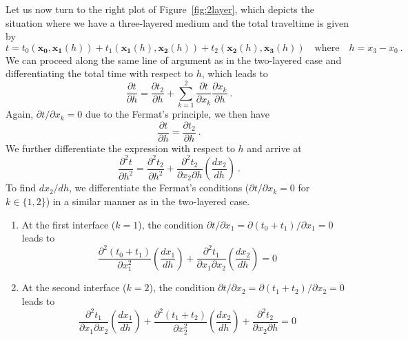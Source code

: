 Let us now turn to the right plot of Figure~\ref{fig:2layer}, which depicts the situation where we have a three-layered medium and the total traveltime is given by
\begin{equation}
\label{eq:time3l}
t = t_0(\mathbf{x_0},\mathbf{x_1}(h)) + t_1(\mathbf{x_1}(h),\mathbf{x_2}(h)) + t_2(\mathbf{x_2}(h),\mathbf{x_3}(h)) \quad\text{where}\quad h = x_3-x_0~.
\end{equation}
We can proceed along the same line of argument as in the two-layered case and differentiating the total time with respect to $h$, which leads to
\begin{equation}
\frac{\partial t}{\partial h} = \frac{\partial t_2}{\partial h} +  \sum^2_{k=1} \frac{\partial t}{\partial x_k}  \frac{\partial x_k}{\partial h}~.
\end{equation}
Again, $\partial t / \partial x_k = 0$ due to the Fermat's principle, we then have
\begin{equation}
\frac{\partial t}{\partial h}  = \frac{\partial t_2}{\partial h}~.
\end{equation}
We further differentiate the expression with respect to $h$ and arrive at 
\begin{equation}
\label{eq:2d3l}
\frac{\partial^2 t}{\partial h^2} = \frac{\partial^2 t_2}{\partial h^2} + \frac{\partial^2 t_2}{\partial x_2 \partial h}\left( \frac{d x_2}{d h}\right) ~.
\end{equation}
To find $d x_2/ d h$, we differentiate the Fermat's conditions ($\partial t / \partial x_k = 0$ for $k \in \{1,2\}$) in a similar manner as in the two-layered case. 
\begin{enumerate}
\item  At the first interface ($k=1$), the condition $\partial t / \partial x_1 =  \partial ( t_0+t_1) / \partial x_1  =  0$ leads to 
\begin{equation}
\label{eq:cond1}
\frac{\partial^2 (t_0 + t_1)}{\partial x_1^2} \left( \frac{d x_1}{d h}\right) + \frac{\partial^2 t_1}{\partial x_1 \partial x_2} \left( \frac{d x_2}{d h}\right) = 0
\end{equation}
\item  At the second interface ($k=2$), the condition $\partial t / \partial x_2 =  \partial ( t_1+t_2) / \partial x_2  =  0$ leads to 
\begin{equation}
\label{eq:cond2}
\frac{\partial^2 t_1}{\partial x_1 \partial x_2} \left( \frac{d x_1}{d h}\right) + \frac{\partial^2 (t_1 + t_2)}{\partial x_2^2} \left( \frac{d x_2}{d h}\right) + \frac{\partial^2 t_2}{\partial x_2 \partial h} = 0
\end{equation}
\end{enumerate}
